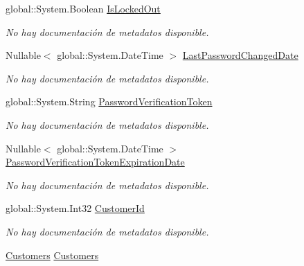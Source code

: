 \begin{DoxyCompactItemize}
global\-::\-System.\-Boolean \hyperlink{class_game_memory_1_1_users_a4def29e0222bfd127b6859ade7a5ca87}{Is\-Locked\-Out}
\begin{DoxyCompactList}\small\item\em No hay documentación de metadatos disponible. \end{DoxyCompactList}\item 
Nullable$<$ global\-::\-System.\-Date\-Time $>$ \hyperlink{class_game_memory_1_1_users_a98f39140ef43f86f9edcff50e40c982a}{Last\-Password\-Changed\-Date}
\begin{DoxyCompactList}\small\item\em No hay documentación de metadatos disponible. \end{DoxyCompactList}\item 
global\-::\-System.\-String \hyperlink{class_game_memory_1_1_users_a70980afbd2f715e7238fc3e8ffcb4741}{Password\-Verification\-Token}
\begin{DoxyCompactList}\small\item\em No hay documentación de metadatos disponible. \end{DoxyCompactList}\item 
Nullable$<$ global\-::\-System.\-Date\-Time $>$ \hyperlink{class_game_memory_1_1_users_af5736cddf03b326304374ae1352404d1}{Password\-Verification\-Token\-Expiration\-Date}
\begin{DoxyCompactList}\small\item\em No hay documentación de metadatos disponible. \end{DoxyCompactList}\item 
global\-::\-System.\-Int32 \hyperlink{class_game_memory_1_1_users_a7374f9d0dc506d2044098f621fd5397a}{Customer\-Id}
\begin{DoxyCompactList}\small\item\em No hay documentación de metadatos disponible. \end{DoxyCompactList}\item 
\hyperlink{class_game_memory_1_1_customers}{Customers} \hyperlink{class_game_memory_1_1_users_aa00fe3516ae95f465ff77d338217736a}{Customers}

\end{DoxyCompactItemize}
